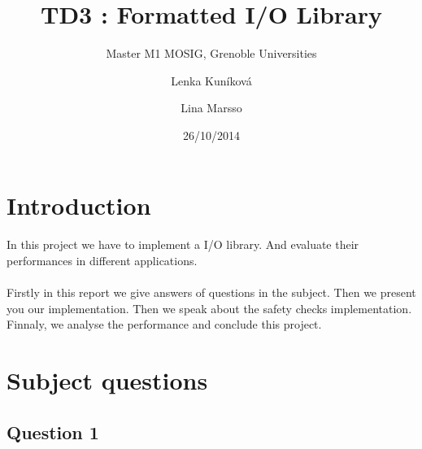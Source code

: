 \documentclass[a4paper,10pt]{article}
\title{TD3 : Formatted I/O Library}
\subtitle{Master M1 MOSIG, Grenoble Universities}
\author{Lenka Kun\'{i}kov\'{a} \and Lina Marsso}
\date{26/10/2014}
\begin{document}


\maketitle



\section{Introduction}
	\paragraph{}
	In this project we have to implement a I/O  library. 
	And evaluate their performances in different applications.
	\paragraph{}
	Firstly in this report we give answers of questions in the subject. 
	Then we present you our implementation.
	Then we speak about the safety checks implementation. 
	Finnaly, we analyse the performance and conclude this project.

\section{Subject questions}
\subsection{Question 1}
\end{document}
